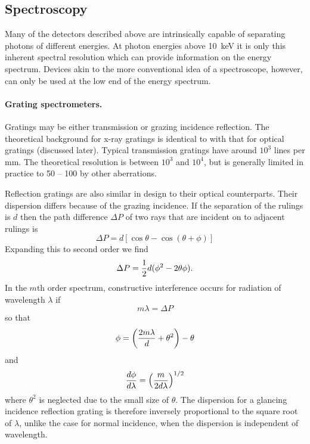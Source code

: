 \subsection{Spectroscopy}

Many of the detectors described above are intrinsically capable of separating 
photons of different energies. At photon energies above 10~keV it is only this
inherent spectral resolution which can provide information on the energy spectrum.
Devices akin to the more conventional idea of a spectroscope, however, can only 
be used at the low end of the energy spectrum.

\paragraph{Grating spectrometers.} Gratings may be either transmission or grazing
incidence reflection. The theoretical background for x-ray gratings is identical
to with that for optical gratings (discussed later). Typical transmission
gratings have around $10^3$ lines per mm. The theoretical resolution is
between $10^3$ and $10^4$, but is generally limited in practice to 50 -- 100 by
other aberrations.

Reflection gratings are also similar in design to their optical counterparts.
Their dispersion differs because of the grazing incidence. If the separation
of the rulings is $d$ then the path difference $\Delta P$ of two rays that
are incident on to adjacent rulings is
\[
\Delta P=d[\cos\theta-\cos(\theta+\phi)]
\]
Expanding this to second order we find
\[
\Delta P={1\over 2}d(\phi^2-2\theta\phi).
\]
In the $m$th order spectrum, constructive interference occurs for radiation
of wavelength $\lambda$ if 
\[
m\lambda=\Delta P
\]
so that
\[
\phi=\left({{2m\lambda\over d}+\theta^2}\right)-\theta
\]
and
\[
{d\phi\over d\lambda}=\left({m\over 2d\lambda}\right)^{1/2}
\]
where $\theta^2$ is neglected due to the small size of $\theta$. The
dispersion for a glancing incidence reflection grating is therefore inversely
proportional to the square root of $\lambda$, unlike the case for normal 
incidence, when the dispersion is independent of wavelength.

